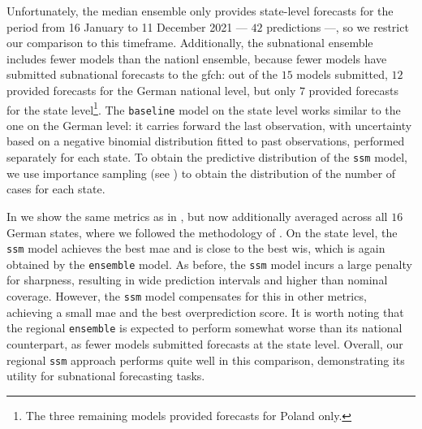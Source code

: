 Unfortunately, the median ensemble only provides state-level forecasts for the period from 16 January to 11 December 2021 --- $42$ predictions ---, so we restrict our comparison to this timeframe. Additionally, the subnational ensemble includes fewer models than the nationl ensemble, because fewer models have submitted subnational forecasts to the \gls{gfch}: out of the $15$ models submitted, $12$ provided forecasts for the German national level, but only $7$ provided forecasts for the state level\footnote{The three remaining models provided forecasts for Poland only.}. The \texttt{baseline} model on the state level works similar to the one on the German level: it carries forward the last observation, with uncertainty based on a negative binomial distribution fitted to past observations, performed separately for each state. 
To obtain the predictive distribution of the \texttt{ssm} model, we use importance sampling (see ) to obtain the distribution of the number of cases for each state.

\begin{table}
    \centering
    
    \caption{Quantitative comparison of the four approaches to one-week ahead forecasts on the state level. All metrics are averaged across the $42$ one-week ahead forecasts made by each model (16 January 2021 to 11 December 2021). We show the same metrics as in , now averaged over the $16$ states of Germany as well all time points.}
    \label{tab:subnational_regional_forecasts_combined_metrics}
\end{table}

In  we show the same metrics as in , but now additionally averaged across all $16$ German states, where we followed the methodology of \citep{Bracher2022National}.
On the state level, the \texttt{ssm} model achieves the best \gls{mae} and is close to the best \gls{wis}, which is again obtained by the \texttt{ensemble} model. As before, the \texttt{ssm} model incurs a large penalty for sharpness, resulting in wide prediction intervals and higher than nominal coverage. However, the \texttt{ssm} model compensates for this in other metrics, achieving a small \gls{mae} and the best overprediction score. It is worth noting that the regional \texttt{ensemble} is expected to perform somewhat worse than its national counterpart, as fewer models submitted forecasts at the state level. Overall, our regional \texttt{ssm} approach performs quite well in this comparison, demonstrating its utility for subnational forecasting tasks.

